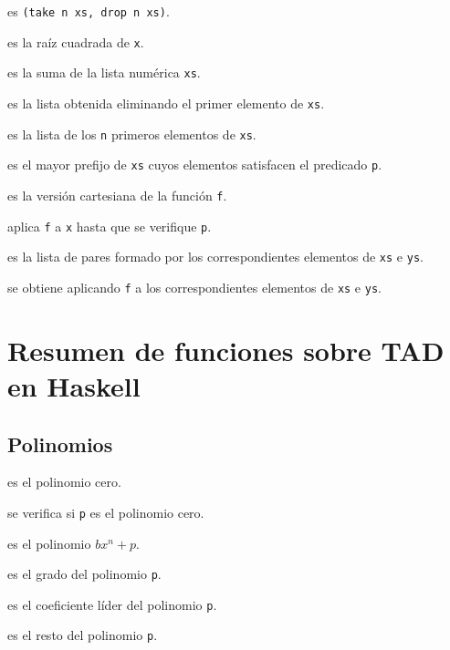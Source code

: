 \begin{enumerate*}
\item {} es \verb|(take n xs, drop n xs)|.
\item {} es la raíz cuadrada de \verb|x|.
\item {} es la suma de la lista numérica \verb|xs|.
\item {} es la lista obtenida eliminando el primer elemento de
  \verb|xs|. 
\item {} es la lista de los \verb|n| primeros elementos de
  \verb|xs|. 
\item {} es el mayor prefijo de \verb|xs| cuyos elementos
  satisfacen el predicado \verb|p|. 
\item {} es la versión cartesiana de la función \verb|f|.
\item {} aplica \verb|f| a \verb|x| hasta que se verifique
  \verb|p|. 
\item {} es la lista de pares formado por los correspondientes
  elementos de \verb|xs| e \verb|ys|.
\item {} se obtiene aplicando \verb|f| a los
  correspondientes elementos de \verb|xs| e \verb|ys|. 
\end{enumerate*}

\section{Resumen de funciones sobre TAD en Haskell}

\subsection{Polinomios}

\begin{enumerate*}
\item {} es el polinomio cero.
\item {} se verifica si \verb|p| es el polinomio cero.
\item {} es el polinomio $bx^n+p$.
\item {} es el grado del polinomio \verb|p|.
\item {} es el coeficiente líder del polinomio \verb|p|.
\item {} es el resto del polinomio \verb|p|.
\end{enumerate*}

